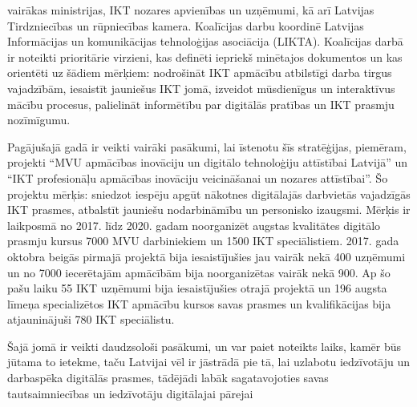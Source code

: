 vairākas ministrijas, IKT nozares apvienības un uzņēmumi, kā arī Latvijas Tirdzniecības un
rūpniecības kamera. Koalīcijas darbu koordinē Latvijas Informācijas un komunikācijas
tehnoloģijas asociācija (LIKTA). Koalīcijas darbā ir noteikti prioritārie virzieni, kas definēti
iepriekš minētajos dokumentos un kas orientēti uz šādiem mērķiem: nodrošināt IKT
apmācību atbilstīgi darba tirgus vajadzībām, iesaistīt jauniešus IKT jomā, izveidot
mūsdienīgus un interaktīvus mācību procesus, palielināt informētību par digitālās pratības un
IKT prasmju nozīmīgumu.
\par
Pagājušajā gadā ir veikti vairāki pasākumi, lai īstenotu šīs stratēģijas, piemēram, projekti
“MVU apmācības inovāciju un digitālo tehnoloģiju attīstībai Latvijā” un “IKT profesionāļu
apmācības inovāciju veicināšanai un nozares attīstībai”. Šo projektu mērķis: sniedzot
iespēju apgūt nākotnes digitālajās darbvietās vajadzīgās IKT prasmes, atbalstīt jauniešu
nodarbināmību un personisko izaugsmi. Mērķis ir laikposmā no 2017. līdz 2020. gadam
noorganizēt augstas kvalitātes digitālo prasmju kursus 7000 MVU darbiniekiem un 1500 IKT
speciālistiem. 2017. gada oktobra beigās pirmajā projektā bija iesaistījušies jau vairāk nekā
400 uzņēmumi un no 7000 iecerētajām apmācībām bija noorganizētas vairāk nekā 900. Ap
šo pašu laiku 55 IKT uzņēmumi bija iesaistījušies otrajā projektā un 196 augsta līmeņa
specializētos IKT apmācību kursos savas prasmes un kvalifikācijas bija atjauninājuši 780 IKT
speciālistu.
\par
Šajā jomā ir veikti daudzsološi pasākumi, un var paiet noteikts laiks, kamēr būs jūtama to
ietekme, taču Latvijai vēl ir jāstrādā pie tā, lai uzlabotu iedzīvotāju un darbaspēka digitālās
prasmes, tādējādi labāk sagatavojoties savas tautsaimniecības un iedzīvotāju digitālajai
pārejai